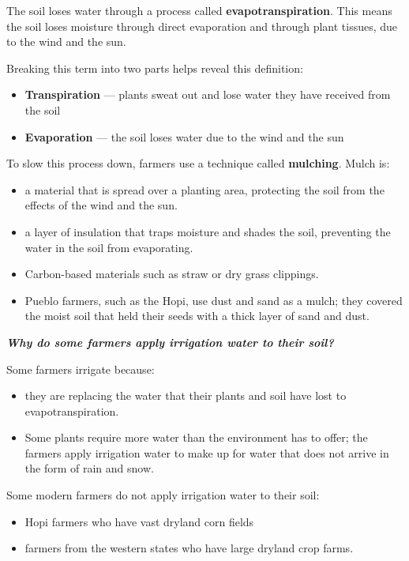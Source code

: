\documentclass[12pt,]{article}
\providecommand{\tightlist}{%
  \setlength{\itemsep}{0pt}\setlength{\parskip}{0pt}}
\begin{document}
The soil loses water through a process called \textbf{evapotranspiration}. This means the soil loses moisture through direct evaporation and through plant tissues, due to the wind and the sun.

Breaking this term into two parts helps reveal this definition:

\begin{itemize}
\tightlist
\item
  \textbf{Transpiration} --- plants sweat out and lose water they have received from the soil
\item
  \textbf{Evaporation} --- the soil loses water due to the wind and the sun
\end{itemize}

To slow this process down, farmers use a technique called \textbf{mulching}. Mulch is:

\begin{itemize}
\tightlist
\item
  a material that is spread over a planting area, protecting the soil from the effects of the wind and the sun.
\item
  a layer of insulation that traps moisture and shades the soil, preventing the water in the soil from evaporating.
\item
  Carbon-based materials such as straw or dry grass clippings.
\item
  Pueblo farmers, such as the Hopi, use dust and sand as a mulch; they covered the moist soil that held their seeds with a thick layer of sand and dust.
\end{itemize}

\textbf{\emph{Why do some farmers apply irrigation water to their soil? }}

Some farmers irrigate because:

\begin{itemize}
\tightlist
\item
  they are replacing the water that their plants and soil have lost to evapotranspiration.
\item
  Some plants require more water than the environment has to offer; the farmers apply irrigation water to make up for water that does not arrive in the form of rain and snow.
\end{itemize}

Some modern farmers do not apply irrigation water to their soil:

\begin{itemize}
\tightlist
\item
  Hopi farmers who have vast dryland corn fields
\item
  farmers from the western states who have large dryland crop farms.
\end{itemize}
\end{document}
